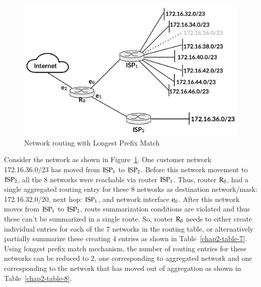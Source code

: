 \begin{multicols}{2}
\begin{figure}[H]
\centering
\includegraphics[scale=.8]{src/Figures/chap2/chap2-fig03.jpg}
\caption{Network routing with Longest Prefix Match}\label{chap2-fig03}
\end{figure}

Consider the network as shown in Figure~\ref{chap2-fig03}. One customer network 172.16.36.0/23 has moved from ${\rm ISP}_{1}$ to ${\rm ISP}_{2}$. Before this network movement to ${\rm ISP}_{2}$, all the 8 networks were reachable via router ${\rm ISP}_{1}$.  Thus, router ${\rm R}_{0}$, had a single aggregated routing entry for these 8 networks as destination network/mask: 172.16.32.0/20, next hop: ${\rm ISP}_{1}$, and network interface ${\rm e}_{0}$.  After this network moves from ${\rm ISP}_{1}$ to ${\rm ISP}_{2}$, route summarization conditions are violated and thus these can’t be summarized in a single route. So, router ${\rm R}_{0}$ needs to either create individual entries for each of the 7 networks in the routing table, or alternatively partially summarize these creating 4 entries as shown in Table~\ref{chap2-table-7}. Using longest prefix match mechanism, the number of routing entries for these networks can be reduced to 2, one corresponding to aggregated network and one corresponding to the network that has moved out of aggregation as shown in Table~\ref{chap2-table-8}.
\end{multicols}

